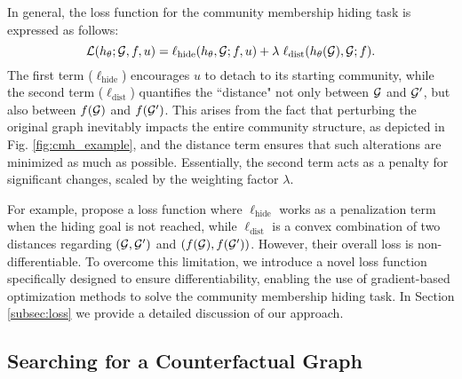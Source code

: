 In general, the loss function for the community membership hiding task is expressed as follows:
\begin{equation}
    \small
    \mathcal{L}(h_{\theta}; \graph,f,u) = \ell_{\text{hide}}(h_{\theta},\graph;f,u) + \lambda \ \ell_{\text{dist}}(h_{\theta}(\graph),\graph;f) .
\end{equation}
The first term ($\ell_{\text{hide}}$) encourages $u$ to detach to its starting community, while the second term ($\ell_{\text{dist}}$) quantifies the ``distance" not only between $\mathcal{G}$ and $\mathcal{G}'$, but also between $f(\mathcal{G})$ and $f(\mathcal{G}')$. This arises from the fact that perturbing the original graph inevitably impacts the entire community structure, as depicted in Fig. \ref{fig:cmh_example}, and the distance term ensures that such alterations are minimized as much as possible. Essentially, the second term acts as a penalty for significant changes, scaled by the weighting factor $\lambda$.

For example, \citet{bernini2024kdd} propose a loss function where $\ell_{\text{hide}}$ works as a penalization term when the hiding goal is not reached, while $\ell_{\text{dist}}$ is a convex combination of two distances regarding $(\mathcal{G},\mathcal{G}')$ and $(f(\mathcal{G}), f(\mathcal{G}'))$.
However, their 
overall loss is non-differentiable.  
To overcome this limitation, we introduce a novel loss function specifically designed to ensure differentiability, enabling the use of gradient-based optimization methods to solve the community membership hiding task. In Section \ref{subsec:loss} we provide a detailed discussion of our approach.


\subsection{Searching for a Counterfactual Graph}
\label{sec:objective}

